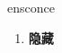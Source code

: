 
\begin{frame}
{\huge ensconce}
\begin{center}
\begin{enumerate}\Large
  \item \textbf{隐藏}
\end{enumerate}
\end{center}
\end{frame}
